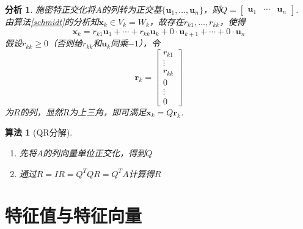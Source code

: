\documentclass[11pt,UTF8]{ctexart}
\newtheorem{algorithm}{算法}
\newtheorem*{analysis}{分析}
\def\vx{\mathbf{x}}
\newcommand{\vb}[1]{\mathbf{#1}}
\newcommand{\bmat}[2]{\begin{bmatrix}{#1}&\cdots&{#2}\end{bmatrix}}
\begin{document}
\begin{analysis}
施密特正交化将$A$的列转为正交基$\{\mathbf{u}_1,\dots,\mathbf{u}_n\}$，则$Q=\bmat{\vb{u}_1}{\vb{u}_n}$.\\
由算法\ref{schmidt}的分析知$\vx_k\in V_k=W_k$，故存在$r_{k1},\dots,r_{kk}$，使得
\[\vx_k=r_{k1}\vb{u}_1+\cdots+r_{kk}\vb{u}_k+0\cdot\vb{u}_{k+1}+\cdots+0\cdot\vb{u}_n\]
假设$r_{kk}\geq 0$（否则给$r_{kk}$和$\vb{u}_k$同乘$-1$），令
\[\vb{r}_k=\begin{bmatrix}r_{k1}\\\vdots\\r_{kk}\\0\\\vdots\\0\end{bmatrix}\]
为$R$的列，显然$R$为上三角，即可满足$\vx_k=Q\vb{r}_k$.
\end{analysis}
\begin{algorithm}[QR分解]
\begin{enumerate}
	\itemsep -3pt
	\item 先将$A$的列向量单位正交化，得到$Q$
	\item 通过$R=IR=Q^TQR=Q^TA$计算得$R$
\end{enumerate}
\end{algorithm}


\section{特征值与特征向量}
\end{document}
